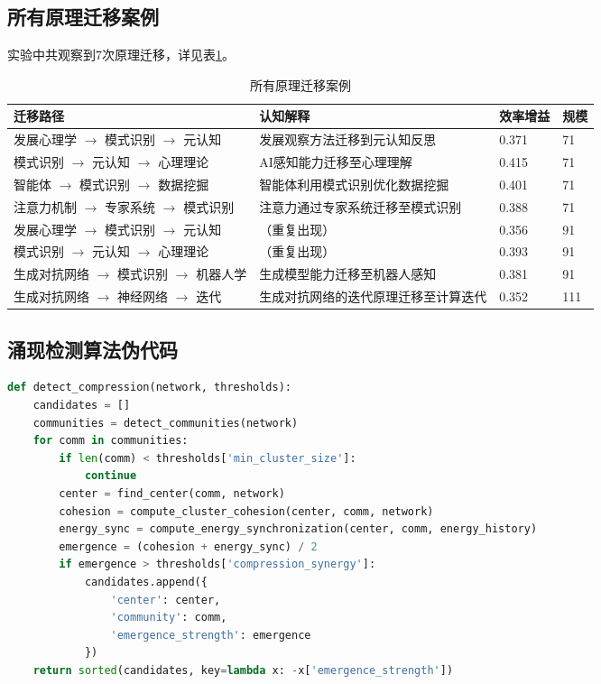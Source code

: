 \documentclass[12pt,a4paper]{article}
\begin{document}
\subsection{所有原理迁移案例}

实验中共观察到7次原理迁移，详见表\ref{tab:app_migration_cases}。

\begin{table}[H]
\centering
\caption{所有原理迁移案例}
\label{tab:app_migration_cases}
\begin{tabular}{p{4cm}p{4.5cm}p{2cm}p{1cm}}
\toprule
\textbf{迁移路径} & \textbf{认知解释} & \textbf{效率增益} & \textbf{规模} \\
\midrule
发展心理学 $\rightarrow$ 模式识别 $\rightarrow$ 元认知 & 发展观察方法迁移到元认知反思 & 0.371 & 71 \\
模式识别 $\rightarrow$ 元认知 $\rightarrow$ 心理理论 & AI感知能力迁移至心理理解 & 0.415 & 71 \\
智能体 $\rightarrow$ 模式识别 $\rightarrow$ 数据挖掘 & 智能体利用模式识别优化数据挖掘 & 0.401 & 71 \\
注意力机制 $\rightarrow$ 专家系统 $\rightarrow$ 模式识别 & 注意力通过专家系统迁移至模式识别 & 0.388 & 71 \\
发展心理学 $\rightarrow$ 模式识别 $\rightarrow$ 元认知 & （重复出现） & 0.356 & 91 \\
模式识别 $\rightarrow$ 元认知 $\rightarrow$ 心理理论 & （重复出现） & 0.393 & 91 \\
生成对抗网络 $\rightarrow$ 模式识别 $\rightarrow$ 机器人学 & 生成模型能力迁移至机器人感知 & 0.381 & 91 \\
生成对抗网络 $\rightarrow$ 神经网络 $\rightarrow$ 迭代 & 生成对抗网络的迭代原理迁移至计算迭代 & 0.352 & 111 \\
\bottomrule
\end{tabular}
\end{table}

\subsection{涌现检测算法伪代码}

\begin{lstlisting}[language=Python, caption=概念压缩检测算法]
def detect_compression(network, thresholds):
    candidates = []
    communities = detect_communities(network)
    for comm in communities:
        if len(comm) < thresholds['min_cluster_size']:
            continue
        center = find_center(comm, network)
        cohesion = compute_cluster_cohesion(center, comm, network)
        energy_sync = compute_energy_synchronization(center, comm, energy_history)
        emergence = (cohesion + energy_sync) / 2
        if emergence > thresholds['compression_synergy']:
            candidates.append({
                'center': center,
                'community': comm,
                'emergence_strength': emergence
            })
    return sorted(candidates, key=lambda x: -x['emergence_strength'])
\end{lstlisting}
\end{document}
